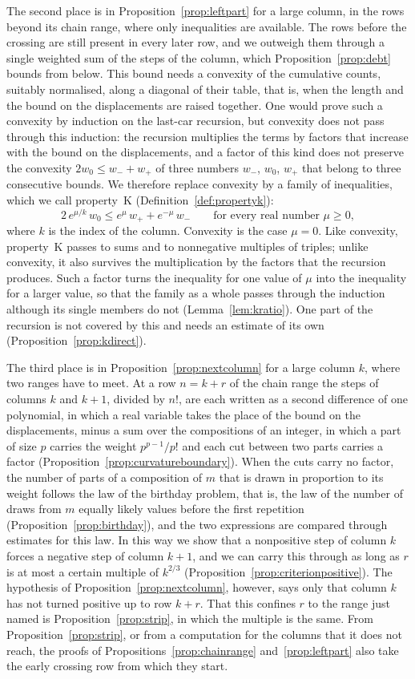 \documentclass{amsart}
\theoremstyle{definition}
\theoremstyle{remark}
\numberwithin{equation}{section}
\begin{document}
The second place is in Proposition~\ref{prop:leftpart} for a large column, in the rows beyond its chain range, where only inequalities are available. The rows before the crossing are still present in every later row, and we outweigh them through a single weighted sum of the steps of the column, which Proposition~\ref{prop:debt} bounds from below. This bound needs a convexity of the cumulative counts, suitably normalised, along a diagonal of their table, that is, when the length and the bound on the displacements are raised together. One would prove such a convexity by induction on the last-car recursion, but convexity does not pass through this induction: the recursion multiplies the terms by factors that increase with the bound on the displacements, and a factor of this kind does not preserve the convexity $2w_0\le w_-+w_+$ of three numbers $w_-$, $w_0$, $w_+$ that belong to three consecutive bounds. We therefore replace convexity by a family of inequalities, which we call property~K (Definition~\ref{def:propertyk}):
\[
2\,e^{\mu/k}\,w_0\le e^{\mu}\,w_++e^{-\mu}\,w_-\qquad\text{for every real number }\mu\ge 0,
\]
where $k$ is the index of the column. Convexity is the case $\mu=0$. Like convexity, property~K passes to sums and to nonnegative multiples of triples; unlike convexity, it also survives the multiplication by the factors that the recursion produces. Such a factor turns the inequality for one value of $\mu$ into the inequality for a larger value, so that the family as a whole passes through the induction although its single members do not (Lemma~\ref{lem:kratio}). One part of the recursion is not covered by this and needs an estimate of its own (Proposition~\ref{prop:kdirect}).

The third place is in Proposition~\ref{prop:nextcolumn} for a large column $k$, where two ranges have to meet. At a row $n=k+r$ of the chain range the steps of columns $k$ and $k+1$, divided by $n!$, are each written as a second difference of one polynomial, in which a real variable takes the place of the bound on the displacements, minus a sum over the compositions of an integer, in which a part of size $p$ carries the weight $p^{p-1}/p!$ and each cut between two parts carries a factor (Proposition~\ref{prop:curvatureboundary}). When the cuts carry no factor, the number of parts of a composition of $m$ that is drawn in proportion to its weight follows the law of the birthday problem, that is, the law of the number of draws from $m$ equally likely values before the first repetition (Proposition~\ref{prop:birthday}), and the two expressions are compared through estimates for this law. In this way we show that a nonpositive step of column $k$ forces a negative step of column $k+1$, and we can carry this through as long as $r$ is at most a certain multiple of $k^{2/3}$ (Proposition~\ref{prop:criterionpositive}). The hypothesis of Proposition~\ref{prop:nextcolumn}, however, says only that column $k$ has not turned positive up to row $k+r$. That this confines $r$ to the range just named is Proposition~\ref{prop:strip}, in which the multiple is the same. From Proposition~\ref{prop:strip}, or from a computation for the columns that it does not reach, the proofs of Propositions~\ref{prop:chainrange} and~\ref{prop:leftpart} also take the early crossing row from which they start.
\end{document}
